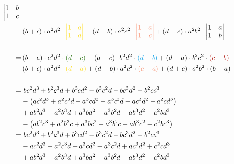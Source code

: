 \documentclass[main.tex]{subfiles}
\begin{document}
\begin{align*}
{\begin{vmatrix}
        1 & b \\
        1 & c \\
    \end{vmatrix}}\\
    -& \left( b + c \right) \cdot a^2 d^2 \cdot
    \textcolor{Goldenrod}{\begin{vmatrix}
        1 & a \\
        1 & d \\
    \end{vmatrix}}
    + \left( d - b \right) \cdot a^2 c^2 \cdot
    \textcolor{Melon}{\begin{vmatrix}
        1 & a \\
        1 & c \\
    \end{vmatrix}}
    + \left( d + c \right) \cdot a^2 b^2 \cdot
    \begin{vmatrix}
        1 & a \\
        1 & b \\
    \end{vmatrix}\\
    \\
    =& 
    \left( b - a \right) \cdot c^2 d^2 \cdot 
    \textcolor{OliveGreen}{(d - c)} 
    + \left( a - c \right) \cdot b^2 d^2 \cdot
    \textcolor{Cerulean}{(d-b)}
    + \left( d - a \right) \cdot b^2 c^2 \cdot
    \textcolor{BrickRed}{(c-b)}\\
    -& \left( b + c \right) \cdot a^2 d^2 \cdot
    \textcolor{Goldenrod}{(d-a)}
    + \left( d - b \right) \cdot a^2 c^2 \cdot
    \textcolor{Melon}{(c-a)}
    + \left( d + c \right) \cdot a^2 b^2 \cdot
    (b-a)\\
    \\
%
%
=&\  b c^2 d^3 + b^2 c^3 d + b^3 c d^2 - b^3 c^2 d - b c^3 d^2 - b^2 c d^3 \\
     & - \left( a c^2 d^3 + a^2 c^3 d + a^3 c d^2 - a^3 c^2 d - a c^3 d^2 - a^2 c d^3 \right) \\
     & + a b^2 d^3 + a^2 b^3 d + a^3 b d^2 - a^3 b^2 d - a b^3 d^2 - a^2 b d^3 \\
     & - \left( a b^2 c^3 + a^2 b^3 c + a^3 b c^2 - a^3 b^2 c - a b^3 c^2 - a^2 b c^3 \right) \\
    =&\  b c^2 d^3 + b^2 c^3 d + b^3 c d^2 - b^3 c^2 d - b c^3 d^2 - b^2 c d^3 \\
     & - a c^2 d^3 - a^2 c^3 d - a^3 c d^2 + a^3 c^2 d + a c^3 d^2 + a^2 c d^3 \\
     & + a b^2 d^3 + a^2 b^3 d + a^3 b d^2 - a^3 b^2 d - a b^3 d^2 - a^2 b d^3 \\

\end{align*}
\end{document}
